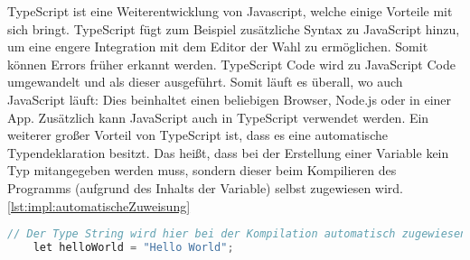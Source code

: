 TypeScript ist eine Weiterentwicklung von Javascript, welche einige Vorteile mit sich bringt. TypeScript fügt zum Beispiel zusätzliche Syntax zu JavaScript hinzu, um eine engere Integration mit dem Editor der Wahl zu ermöglichen. Somit können Errors früher erkannt werden. TypeScript Code wird zu JavaScript Code umgewandelt und als dieser ausgeführt. Somit läuft es überall, wo auch JavaScript läuft: Dies beinhaltet einen beliebigen Browser, Node.js oder in einer App. Zusätzlich kann JavaScript auch in TypeScript verwendet werden. Ein weiterer großer Vorteil von TypeScript ist, dass es eine automatische Typendeklaration besitzt. Das heißt, dass bei der Erstellung einer Variable kein Typ mitangegeben werden muss, sondern dieser beim Kompilieren des Programms (aufgrund des Inhalts der Variable) selbst zugewiesen wird. \ref{lst:impl:automatischeZuweisung}

\cite{JavaScriptJavaEntwickler} 
\cite{TypeScriptOverview} 

\begin{lstlisting}[language=java,caption=TypeScript automatische Zuweisung,label=lst:impl:automatischeZuweisung]
    // Der Type String wird hier bei der Kompilation automatisch zugewiesen
    let helloWorld = "Hello World";
\end{lstlisting}